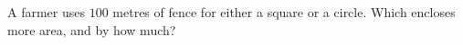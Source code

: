 A farmer uses $100$ metres of fence for either a square or a circle. Which encloses more area, and by how much?
